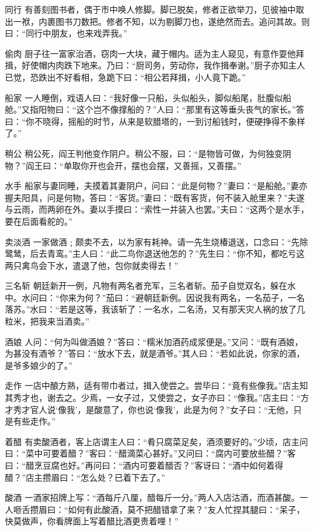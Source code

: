 \documentclass[12pt,UTF8]{ctexbook}
\begin{document}
同行
有善刻图书者，偶于市中唤人修脚。脚已脱矣，修者正欲举刀，见彼袖中取出一袱，内裹图书刀数把。修者不知，以为剔脚刀也，遂绝然而去。追问其故。则曰：“同行中朋友，也来戏弄我。”

偷肉
厨子往一富家治酒，窃肉一大块，藏于帽内。适为主人窥见，有意作耍他拜揖，好使帽内肉跌下地来。乃曰：“厨司务，劳动你，我作揖奉谢。”厨子亦知主人已觉，恐跌出不好看相，急跪下曰：“相公若拜揖，小人竟下跪。”

船家
一人睡倒，戏语人曰：“我好像一只船，头似船头，脚似船尾，肚腹似船舱。”又指阳物曰：“这个岂不像撑船的？”人曰：“那里有这等垂头丧气的家长。”答曰：“你不晓得，摇船的时节，从来是软腊塔的，一到讨船钱时，便硬挣得不象样了。”

稍公
稍公死，阎王判他变作阴户。稍公不服，曰：“是物皆可做，为何独变阴物？”阎王曰：“单取你开也会开，摆也会摆，又善摇，又善摆。”

水手
船家与妻同睡，夫摸着其妻阴户，问曰：“此是何物？”妻曰：“是船舱。”妻亦握夫阳具，问是何物，答曰：“客货。”妻曰：“既有客货，何不装入舱里来？”夫遂与云雨，而两卵在外。妻以手摸曰：“索性一并装入也罢。”夫曰：“这两个是水手，要在后面看舵的。”

卖淡酒
一家做酒﹔颇卖不去，以为家有耗神。请一先生烧椿退送，口念曰：“先除鹭鸶，后去青鸾。”主人曰：“此二鸟你退送他怎的？”先生曰：“你不知，都吃亏这两只禽鸟会下水，遣退了他，包你就卖得去！”

三名斩
朝廷新开一例，凡物有两名者充军，三名者斩。茄子自觉双名，躲在水中。水问曰：“你来为何？”茄曰：“避朝廷新例。因说我有两名，一名茄子，一名落苏。”水曰：“若是这等，我该斩了：一名水，二名汤，又有那天灾人祸的放了几粒米，把我来当酒卖。”

酒娘
人问：“何为叫做酒娘？”答曰：“糯米加酒药成浆便是。”又问：“既有酒娘，为甚没有酒爷？”答曰：“放水下去，就是酒爷。”其人曰：“若如此说，你家的酒，是爷多娘少的了。”

走作
一店中酿方熟，适有带巾者过，揖入使尝之。尝毕曰：“竟有些像我。”店主知其秀才也，谢去之。少焉，一女子过，又使尝之，女子亦曰：“像我。”店主曰：“方才秀才官人说‘像我’，是酸意了，你也说‘像我’，此是为何？”女子曰：“无他，只是有些走作。”

着醋
有卖酸酒者，客上店谓主人曰：“肴只腐菜足矣，酒须要好的。”少顷，店主问曰：“菜中可要着醋？”客曰：“醋滴菜心甚好。”又问曰：“腐内可要放些醋？”客曰：“醋烹豆腐也好。”再问曰：“酒内可要着醋否？”客讶曰：“酒中如何着得醋？”店主攒眉曰：“怎么处？已着下去了。”

酸酒
一酒家招牌上写：“酒每斤八厘，醋每斤一分。”两人入店沽酒，而酒甚酸。一人咂舌攒眉曰：“如何有此酸酒，莫不把醋错拿了来？”友人忙捏其腿曰：“呆子，快莫做声，你看牌面上写着醋比酒更贵着哩！”
\end{document}
